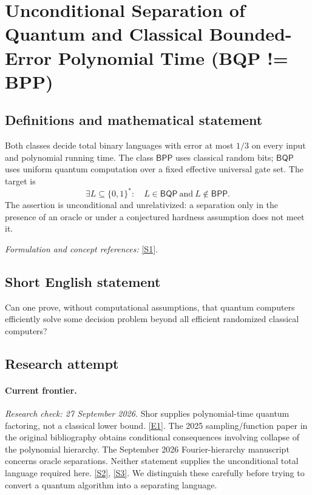 \documentclass[11pt,a4paper]{article}
\newcommand{\sref}[2]{\hyperlink{source:#1:#2}{[S#2]}}
\newcommand{\eref}[2]{\hyperlink{extra:#1:#2}{[E#2]}}
\newif\ifshowcatalogue
\newcommand{\cataloguescope}[1]{\ifshowcatalogue
 \paragraph{Exact scope in the supplied catalogue.}
 \begin{quote}\small #1\end{quote}\fi}
\begin{document}
\setcounter{section}{0}
\clearpage
\section*{\texorpdfstring{Unconditional Separation of Quantum and Classical Bounded-Error Polynomial Time (BQP != BPP)}{Unconditional Separation of Quantum and Classical Bounded-Error Polynomial Time (BQP != BPP)}}\label{30006683}
\subsection{Definitions and mathematical statement}
Both classes decide total binary languages with error at most $1/3$ on every input and polynomial running time. The class $\mathsf{BPP}$ uses classical random bits; $\mathsf{BQP}$ uses uniform quantum computation over a fixed effective universal gate set. The target is
\[
 \exists L\subseteq\{0,1\}^*:\quad L\in\mathsf{BQP}\ \text{and}\ L\notin\mathsf{BPP}.
\]
The assertion is unconditional and unrelativized: a separation only in the presence of an oracle or under a conjectured hardness assumption does not meet it.
\par\smallskip\textit{Formulation and concept references:} \sref{30006683}{1}.
\cataloguescope{Prove unconditionally that bounded-error quantum polynomial time (BQP) strictly contains bounded-error probabilistic polynomial time (BPP).}
\subsection{Short English statement}
Can one prove, without computational assumptions, that quantum computers efficiently solve some decision problem beyond all efficient randomized classical computers?
\subsection{Research attempt}
\paragraph{Current frontier.}
\textit{Research check: 27 September 2026.}
Shor supplies polynomial-time quantum factoring, not a classical lower bound.
\eref{30006683}{1}. The 2025 sampling/function paper in the original bibliography
obtains conditional consequences involving collapse of the polynomial
hierarchy. The September 2026 Fourier-hierarchy manuscript concerns oracle
separations. Neither statement supplies the unconditional total language
required here. \sref{30006683}{2}, \sref{30006683}{3}. We distinguish these carefully
before trying to convert a quantum algorithm into a separating language.
\end{document}
